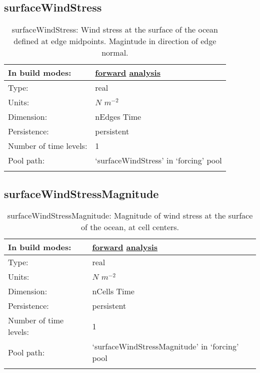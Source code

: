 \subsection[surfaceWindStress]{surfaceWindStress}
\label{subsec:var_sec_forcing_surfaceWindStress}
\begin{center}
\begin{longtable}{| p{2.0in} | p{4.0in} |}
        \hline 
        In build modes: & \hyperref[subsec:forward_var_tab_forcing]{forward} \hyperref[subsec:analysis_var_tab_forcing]{analysis} \\
        \hline 
        Type: & real \\
        \hline 
        Units: & $N$ $m^{-2}$ \\
        \hline 
        Dimension: & nEdges Time \\
        \hline 
        Persistence: & persistent \\
        \hline 
        Number of time levels: & 1 \\
        \hline 
            Pool path: & `surfaceWindStress' in `forcing' pool \\
		 \hline 
    \caption{surfaceWindStress: Wind stress at the surface of the ocean defined at edge midpoints. Magintude in direction of edge normal.}
\end{longtable}
\end{center}
\subsection[surfaceWindStressMagnitude]{surfaceWindStressMagnitude}
\label{subsec:var_sec_forcing_surfaceWindStressMagnitude}
\begin{center}
\begin{longtable}{| p{2.0in} | p{4.0in} |}
        \hline 
        In build modes: & \hyperref[subsec:forward_var_tab_forcing]{forward} \hyperref[subsec:analysis_var_tab_forcing]{analysis} \\
        \hline 
        Type: & real \\
        \hline 
        Units: & $N$ $m^{-2}$ \\
        \hline 
        Dimension: & nCells Time \\
        \hline 
        Persistence: & persistent \\
        \hline 
        Number of time levels: & 1 \\
        \hline 
            Pool path: & `surfaceWindStressMagnitude' in `forcing' pool \\
		 \hline 
    \caption{surfaceWindStressMagnitude: Magnitude of wind stress at the surface of the ocean, at cell centers.}
\end{longtable}
\end{center}
